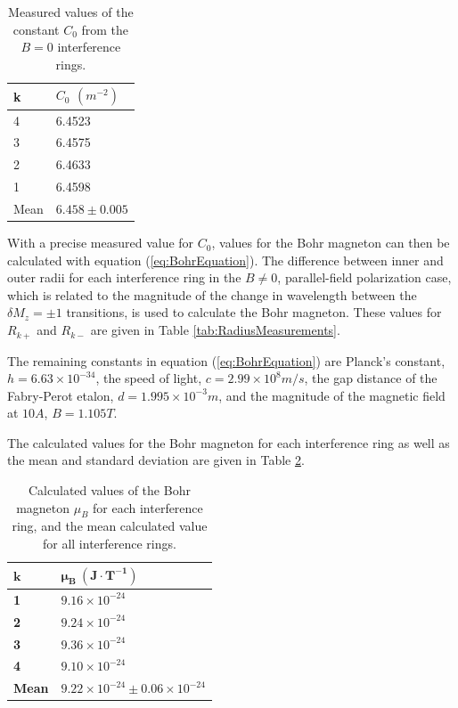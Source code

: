 \documentclass[twocolumn]{article}
\begin{document}
		\begin{table}[]
			\centering
			\begin{tabular}{l|l}
				k & $C_0$ $(m^{-2})$ \\ \hline
				4 & 6.4523 \\
				3 & 6.4575 \\
				2 & 6.4633 \\
				1 & 6.4598 \\ \hline
				Mean & $6.458\pm0.005$
			\end{tabular}
			\caption{Measured values of the constant $C_0$ from the $B=0$ interference rings.}
			\label{tab:C0}
		\end{table}
		
		With a precise measured value for $C_0$, values for the Bohr magneton can then be calculated with equation (\ref{eq:BohrEquation}).
		The difference between inner and outer radii for each interference ring in the $B\neq 0$, parallel-field polarization case, which is related to the magnitude of the change in wavelength between the $\delta M_z = \pm1$ transitions, is used to calculate the Bohr magneton.
		These values for $R_{k+}$ and $R_{k-}$ are given in Table \ref{tab:RadiusMeasurements}.
		
		The remaining constants in equation (\ref{eq:BohrEquation}) are Planck's constant, $h = 6.63\times10^{-34}$, the speed of light, $c = 2.99\times10^8 m/s$, the gap distance of the Fabry-Perot etalon, $d = 1.995\times10^{-3} m$, and the magnitude of the magnetic field at $10 A$, $B = 1.105 T$.
		
		The calculated values for the Bohr magneton for each interference ring as well as the mean and standard deviation are given in Table \ref{tab:BohrCalcs}.
		
		\begin{table}[]
			\centering
			\begin{tabular}{l|l}
				$\mathbf{k}$    & $\mathbf{\boldsymbol{\mu}_B \ (J\cdot T^{-1})}$ \\ \hline
				\textbf{1}    & $9.16\times10^{-24}$   \\
				\textbf{2}    & $9.24\times10^{-24}$   \\
				\textbf{3}    & $9.36\times10^{-24}$   \\
				\textbf{4}    & $9.10\times10^{-24}$   \\ \hline
				\textbf{Mean} & $9.22\times10^{-24}\pm0.06\times10^{-24}$  
			\end{tabular}
			\caption{Calculated values of the Bohr magneton $\mu_B$ for each interference ring, and the mean calculated value for all interference rings.}
			\label{tab:BohrCalcs}
		\end{table}
		
\end{document}
